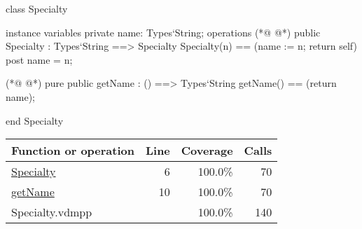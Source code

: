 \begin{vdmpp}[breaklines=true]
class Specialty

instance variables
  private name: Types`String;
operations
(*@
\label{Specialty:6}
@*)
 public Specialty : Types`String ==> Specialty
  Specialty(n) == (name := n; return self)
 post name = n;
  
(*@
\label{getName:10}
@*)
 pure public getName : () ==> Types`String
  getName() == (return name);

end Specialty
\end{vdmpp}
\bigskip
\begin{longtable}{|l|r|r|r|}
\hline
Function or operation & Line & Coverage & Calls \\
\hline
\hline
\hyperref[Specialty:6]{Specialty} & 6&100.0\% & 70 \\
\hline
\hyperref[getName:10]{getName} & 10&100.0\% & 70 \\
\hline
\hline
Specialty.vdmpp & & 100.0\% & 140 \\
\hline
\end{longtable}


